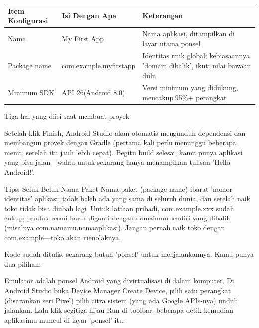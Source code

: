 \begin{center}
\begin{tabularx}{\linewidth}{|X|X|X|}
\hline
\textbf{Item Konfigurasi} & \textbf{Isi Dengan Apa} & \textbf{Keterangan} \tabularnewline
\hline
Name & My First App & Nama aplikasi, ditampilkan di layar utama ponsel \tabularnewline
Package name & com.example.myfirstapp & Identitas unik global; kebiasaannya 'domain dibalik', ikuti nilai bawaan dulu \tabularnewline
Minimum SDK & API 26(Android 8.0) & Versi minimum yang didukung, mencakup 95\%+ perangkat \tabularnewline
\hline
\end{tabularx}
\end{center}

\begin{center}\small\color{gray}Tiga hal yang diisi saat membuat proyek\end{center}

Setelah klik Finish, Android Studio akan otomatis mengunduh dependensi dan membangun proyek dengan Gradle (pertama kali perlu menunggu beberapa menit, setelah itu jauh lebih cepat). Begitu build selesai, kamu punya aplikasi yang bisa jalan—walau untuk sekarang hanya menampilkan tulisan 'Hello Android!'.

\begin{tcbinfo}{Tips: Seluk-Beluk Nama Paket}
Nama paket (package name) ibarat 'nomor identitas' aplikasi; tidak boleh ada yang sama di seluruh dunia, dan setelah naik toko tidak bisa diubah lagi. Untuk latihan pribadi, com.example.xxx sudah cukup; produk resmi harus diganti dengan domainmu sendiri yang dibalik (misalnya com.namamu.namaaplikasi). Jangan pernah naik toko dengan com.example—toko akan menolaknya.

\end{tcbinfo}


Kode sudah ditulis, sekarang butuh 'ponsel' untuk menjalankannya. Kamu punya dua pilihan:


Emulator adalah ponsel Android yang divirtualisasi di dalam komputer. Di Android Studio buka Device Manager Create Device, pilih satu perangkat (disarankan seri Pixel) pilih citra sistem (yang ada Google APIs-nya) unduh jalankan. Lalu klik segitiga hijau Run di toolbar; beberapa detik kemudian aplikasimu muncul di layar 'ponsel' itu.


